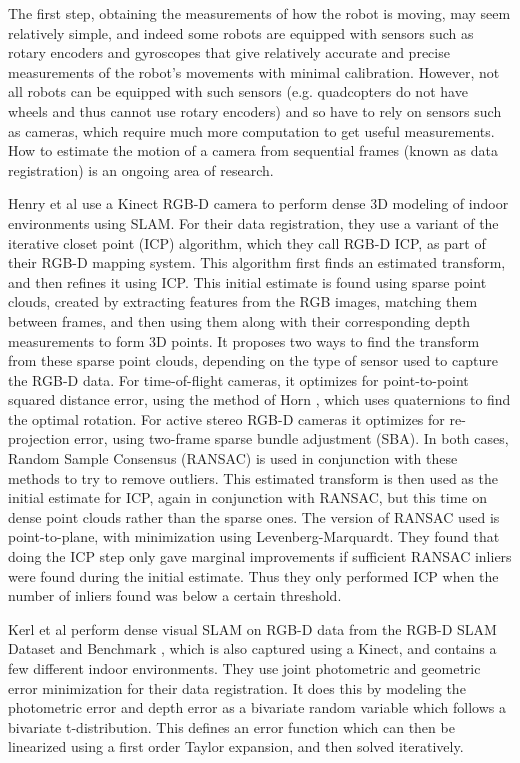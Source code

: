\documentclass[12pt,a4paper]{article}
\begin{document}
    The first step, obtaining the measurements of how the robot is moving, may seem relatively simple, and indeed some robots are equipped with sensors such as rotary encoders and gyroscopes that give relatively accurate and precise measurements of the robot's movements with minimal calibration. However, not all robots can be equipped with such sensors (e.g. quadcopters do not have wheels and thus cannot use rotary encoders) and so have to rely on sensors such as cameras, which require much more computation to get useful measurements. How to estimate the motion of a camera from sequential frames (known as data registration) is an ongoing area of research.
     
    Henry et al \citep{henry2012rgb} use a Kinect RGB-D camera to perform dense 3D modeling of indoor environments using SLAM. For their data registration, they use a variant of the iterative closet point (ICP) algorithm, which they call RGB-D ICP, as part of their RGB-D mapping system. This algorithm first finds an estimated transform, and then refines it using ICP. This initial estimate is found using sparse point clouds, created by extracting features from the RGB images, matching them between frames, and then using them along with their corresponding depth measurements to form 3D points. It proposes two ways to find the transform from these sparse point clouds, depending on the type of sensor used to capture the RGB-D data. For time-of-flight cameras, it optimizes for point-to-point squared distance error, using the method of Horn \citep{horn1988closed}, which uses quaternions to find the optimal rotation. For active stereo RGB-D cameras it optimizes for re-projection error, using two-frame sparse bundle adjustment (SBA). In both cases, Random Sample Consensus (RANSAC) is used in conjunction with these methods to try to remove outliers. This estimated transform is then used as the initial estimate for ICP, again in conjunction with RANSAC, but this time on dense point clouds rather than the sparse ones. The version of RANSAC used is point-to-plane, with minimization using Levenberg-Marquardt. They found that doing the ICP step only gave marginal improvements if sufficient RANSAC inliers were found during the initial estimate. Thus they only performed ICP when the number of inliers found was below a certain threshold.
     
    Kerl et al \citep{kerl2013dense} perform dense visual SLAM on RGB-D data from the {RGB-D SLAM} Dataset and Benchmark \cite{dataset}, which is also captured using a Kinect, and contains a few different indoor environments. They use joint photometric and geometric error minimization for their data registration. It does this by modeling the photometric error and depth error as a bivariate random variable which follows a bivariate t-distribution. This defines an error function which can then be linearized using a first order Taylor expansion, and then solved iteratively.
     
\end{document}
